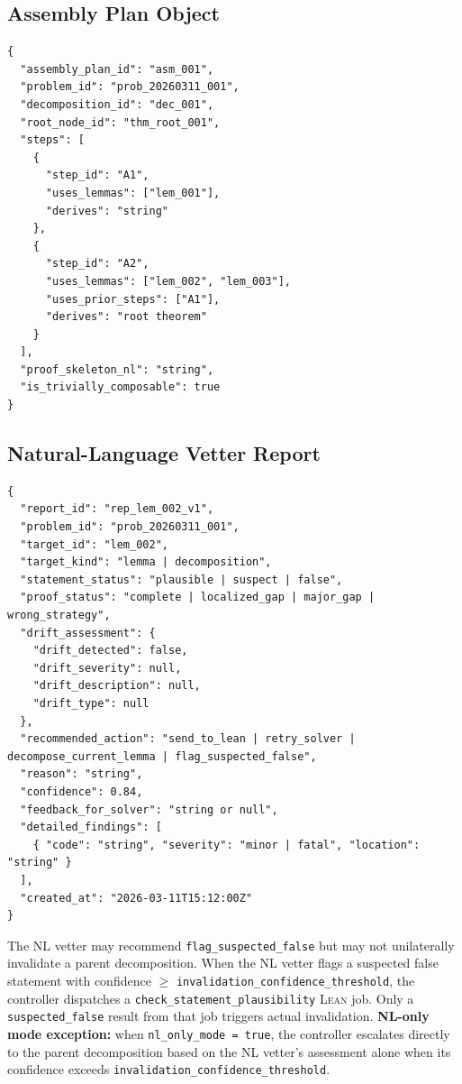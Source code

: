 \documentclass[11pt,a4paper]{article}
\newcommand{\Lean}{\textsc{Lean}}
\begin{document}
\subsection{Assembly Plan Object}

\begin{lstlisting}
{
  "assembly_plan_id": "asm_001",
  "problem_id": "prob_20260311_001",
  "decomposition_id": "dec_001",
  "root_node_id": "thm_root_001",
  "steps": [
    {
      "step_id": "A1",
      "uses_lemmas": ["lem_001"],
      "derives": "string"
    },
    {
      "step_id": "A2",
      "uses_lemmas": ["lem_002", "lem_003"],
      "uses_prior_steps": ["A1"],
      "derives": "root theorem"
    }
  ],
  "proof_skeleton_nl": "string",
  "is_trivially_composable": true
}
\end{lstlisting}

\subsection{Natural-Language Vetter Report}

\begin{lstlisting}
{
  "report_id": "rep_lem_002_v1",
  "problem_id": "prob_20260311_001",
  "target_id": "lem_002",
  "target_kind": "lemma | decomposition",
  "statement_status": "plausible | suspect | false",
  "proof_status": "complete | localized_gap | major_gap | wrong_strategy",
  "drift_assessment": {
    "drift_detected": false,
    "drift_severity": null,
    "drift_description": null,
    "drift_type": null
  },
  "recommended_action": "send_to_lean | retry_solver | decompose_current_lemma | flag_suspected_false",
  "reason": "string",
  "confidence": 0.84,
  "feedback_for_solver": "string or null",
  "detailed_findings": [
    { "code": "string", "severity": "minor | fatal", "location": "string" }
  ],
  "created_at": "2026-03-11T15:12:00Z"
}
\end{lstlisting}

\begin{mustbox}
The NL vetter may recommend \texttt{flag\_suspected\_false} but may not unilaterally invalidate a parent decomposition. When the NL vetter flags a suspected false statement with confidence $\geq$ \texttt{invalidation\_confidence\_threshold}, the controller dispatches a \texttt{check\_statement\_plausibility} \Lean{} job. Only a \texttt{suspected\_false} result from that job triggers actual invalidation. \textbf{NL-only mode exception:} when \texttt{nl\_only\_mode = true}, the controller escalates directly to the parent decomposition based on the NL vetter's assessment alone when its confidence exceeds \texttt{invalidation\_confidence\_threshold}.
\end{mustbox}
\end{document}
